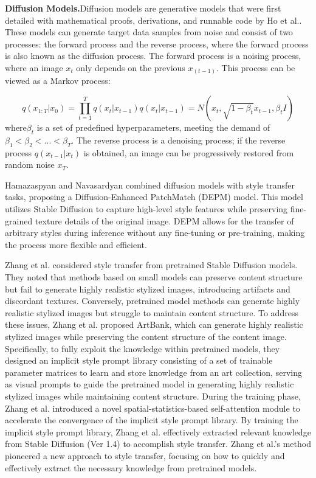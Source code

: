 \documentclass[preprint,12pt]{elsarticle}
\begin{document}
\textbf{Diffusion Models.}\quad Diffusion models are generative models that were first detailed with mathematical proofs, derivations, and runnable code by Ho et al.\citep{58ho2020denoising}. These models can generate target data samples from noise and consist of two processes: the forward process and the reverse process, where the forward process is also known as the diffusion process. The forward process is a noising process, where an image $x_t$ only depends on the previous $x_(t-1)$. This process can be viewed as a Markov process:

\begin{equation}
    q (x_ {1:T}|x_0) = \prod_ {t = 1}^ {T}q (x_t|x_ {t-1}) q (x_t|x_ {t-1}) = N (x_t, \sqrt {1-\beta_t}x_ {t-1},\beta_t I)
\end{equation} 
where$\beta_t$ is a set of predefined hyperparameters, meeting the demand of  $\beta_1<\beta_2<...<\beta_T$. The reverse process is a denoising process; if the reverse process $ q (x_ {t-1}|x_ {t})$ is obtained, an image can be progressively restored from random noise $x_T$.

Hamazaspyan and Navasardyan\citep{59hamazaspyan2023diffusion} combined diffusion models with style transfer tasks, proposing a Diffusion-Enhanced PatchMatch (DEPM) model. This model utilizes Stable Diffusion to capture high-level style features while preserving fine-grained texture details of the original image. DEPM allows for the transfer of arbitrary styles during inference without any fine-tuning or pre-training, making the process more flexible and efficient.

Zhang et al.\citep{60zhang2024artbank} considered style transfer from pretrained Stable Diffusion models\citep{61rombach2022high}. They noted that methods based on small models can preserve content structure but fail to generate highly realistic stylized images, introducing artifacts and discordant textures. Conversely, pretrained model methods can generate highly realistic stylized images but struggle to maintain content structure. To address these issues, Zhang et al. proposed ArtBank, which can generate highly realistic stylized images while preserving the content structure of the content image. Specifically, to fully exploit the knowledge within pretrained models, they designed an implicit style prompt library consisting of a set of trainable parameter matrices to learn and store knowledge from an art collection, serving as visual prompts to guide the pretrained model in generating highly realistic stylized images while maintaining content structure. During the training phase, Zhang et al. introduced a novel spatial-statistics-based self-attention module to accelerate the convergence of the implicit style prompt library. By training the implicit style prompt library, Zhang et al. effectively extracted relevant knowledge from Stable Diffusion (Ver 1.4) to accomplish style transfer. Zhang et al.'s method pioneered a new approach to style transfer, focusing on how to quickly and effectively extract the necessary knowledge from pretrained models.
\end{document}
